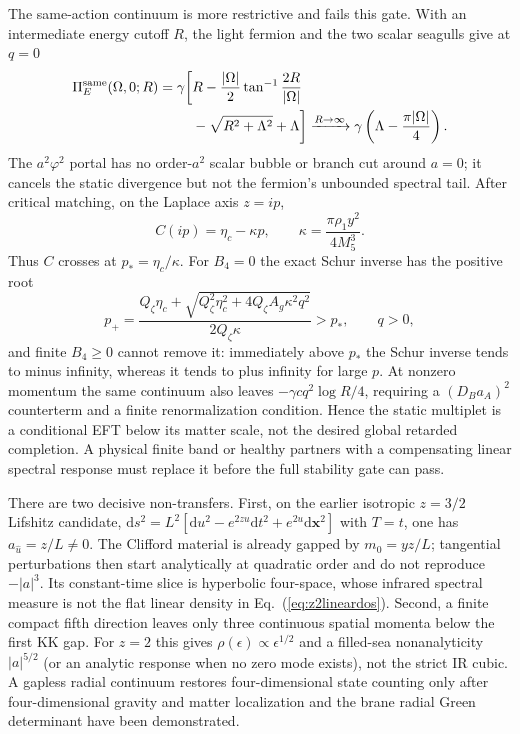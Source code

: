 \documentclass[10pt]{article}
\newcommand{\dd}{\mathrm{d}}
\begin{document}
The same-action continuum is more restrictive and fails this gate.  With an
intermediate energy cutoff $R$, the light fermion and the two scalar seagulls
give at $q=0$
\begin{equation}
 \begin{split}
 \Pi_E^{\rm same}(\Omega,0;R)=\gamma\biggl[&R-\frac{|\Omega|}{2}
 \tan^{-1}\frac{2R}{|\Omega|}\\
 &-\sqrt{R^2+\Lambda^2}+\Lambda\biggr]
 \xrightarrow{R\to\infty}
 \gamma\left(\Lambda-\frac{\pi|\Omega|}{4}\right).
 \end{split}
 \label{eq:z2sameactiondynamic}
\end{equation}
The $a^2\varphi^2$ portal has no order-$a^2$ scalar bubble or branch cut around
$a=0$; it cancels the static divergence but not the fermion's unbounded
spectral tail.  After critical matching, on the Laplace axis $z=ip$,
\begin{equation}
 C(ip)=\eta_c-\kappa p,\qquad
 \kappa=\frac{\pi\rho_1y^2}{4M_5^3}.
 \label{eq:z2sameactionlapse}
\end{equation}
Thus $C$ crosses at $p_*=\eta_c/\kappa$.  For $B_4=0$ the exact Schur inverse
has the positive root
\begin{equation}
 p_+=\frac{Q_\zeta\eta_c+
 \sqrt{Q_\zeta^2\eta_c^2+4Q_\zeta A_g\kappa^2q^2}}
 {2Q_\zeta\kappa}>p_* ,\qquad q>0,
 \label{eq:z2sameactionpole}
\end{equation}
and finite $B_4\geq0$ cannot remove it: immediately above $p_*$ the Schur
inverse tends to minus infinity, whereas it tends to plus infinity for large
$p$.  At nonzero momentum the same continuum also leaves
$-\gamma cq^2\log R/4$, requiring a $(D_Ba_A)^2$ counterterm and a finite
renormalization condition.  Hence the static multiplet is a conditional EFT
below its matter scale, not the desired global retarded completion.  A
physical finite band or healthy partners with a compensating linear spectral
response must replace it before the full stability gate can pass.

There are two decisive non-transfers.  First, on the earlier isotropic
$z=3/2$ Lifshitz candidate,
$\dd s^2=L^2[\dd u^2-e^{2zu}\dd t^2+e^{2u}\dd\mathbf x^2]$ with $T=t$, one has
$a_{\hat u}=z/L\ne0$.  The Clifford material is already gapped by
$m_0=yz/L$; tangential perturbations then start analytically at quadratic
order and do not reproduce $-|a|^3$.  Its constant-time slice is hyperbolic
four-space, whose infrared spectral measure is not the flat linear density in
Eq.~(\ref{eq:z2lineardos}).  Second, a finite compact fifth direction leaves
only three continuous spatial momenta below the first KK gap.  For $z=2$ this
gives $\rho(\epsilon)\propto\epsilon^{1/2}$ and a filled-sea nonanalyticity
$|a|^{5/2}$ (or an analytic response when no zero mode exists), not the strict
IR cubic.  A gapless radial continuum restores four-dimensional state counting
only after four-dimensional gravity and matter localization and the brane
radial Green determinant have been demonstrated.
\end{document}
